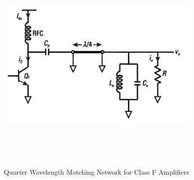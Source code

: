 \begin{figure}
  \centering
  \includegraphics[width=4in,height=4in,keepaspectratio]{figures/detail/quarter_wave_match}\\
  \caption{Quarter Wavelength Matching Network for Class F Amplifiers}
  \label{fig:quarter_wave_match}
\end{figure}




